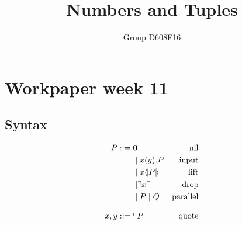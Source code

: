 

\author{Group D608F16}
\title{Numbers and Tuples}



\maketitle

\section{Workpaper week 11}
\subsection{Syntax}
\begin{align*}
P  ::= \; &  \mathbf{0} & \text{nil} \\
  & \mid x(y).P & \text{input} \\
  & \mid x \langle \! | P | \! \rangle & \text{lift} \\
  & \mid \urcorner x \ulcorner & \text{drop} \\
  & \mid P \mid Q & \text{parallel} \\[3mm]
x,y ::= \; & \ulcorner P \urcorner & \text{quote}
\end{align*}
\citep{Meredith2005}



%



\grid
\grid

